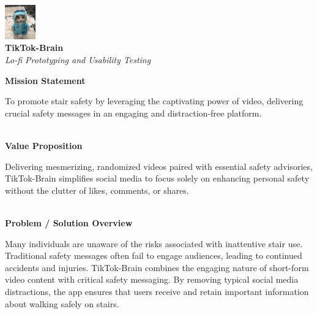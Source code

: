 \documentclass{article}
\begin{document}
\begin{titlepage}
\begin{center}

    \includegraphics[width=0.1\textwidth]{./resources/logo.png} \\
    \vspace{0.5cm}
    {\Huge \textbf{TikTok-Brain}} \\[0.5cm]
    {\LARGE \textit{Lo-fi Prototyping and Usability Testing}} \\[2cm]

\end{center}

    \noindent
    \textbf{\textcolor{TikTokLightBlue}{\Large Mission Statement}} \\[0.3cm]
    \parbox{\textwidth}{
        \large
        To promote stair safety by leveraging the captivating power of video,
        delivering crucial safety messages in an engaging and distraction-free platform.
    } \\[1cm]

    \noindent
    \textbf{\textcolor{TikTokBlack}{\Large Value Proposition}} \\[0.3cm]
    \parbox{\textwidth}{
        \large
        Delivering mesmerizing, randomized videos paired with essential safety advisories,
        TikTok-Brain simplifies social media to focus solely on enhancing personal safety without the clutter of likes, comments, or shares.
    } \\[1cm]


    \noindent
    \textbf{\textcolor{TikTokRed}{\Large Problem / Solution Overview}} \\[0.3cm]
    \parbox{\textwidth}{
        \large
        Many individuals are unaware of the risks associated with inattentive stair use.
        Traditional safety messages often fail to engage audiences, leading to continued accidents and injuries.
        TikTok-Brain combines the engaging nature of short-form video content with critical safety messaging.
        By removing typical social media distractions,
        the app ensures that users receive and retain important information about walking safely on stairs.
    } \\[1.5cm]


\end{titlepage}
\end{document}
